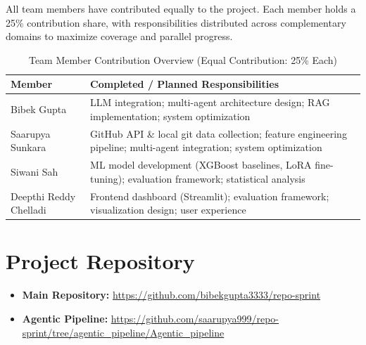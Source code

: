 \documentclass[journal]{IEEEtran}
\begin{document}
All team members have contributed equally to the project. Each member holds a 25\% contribution share, with responsibilities distributed across complementary domains to maximize coverage and parallel progress.

\begin{table}[htbp]
\centering
\caption{Team Member Contribution Overview (Equal Contribution: 25\% Each)}
\label{tab:contributions}
\begin{tabular}{l|p{5.5cm}}
\toprule
\textbf{Member} & \textbf{Completed / Planned Responsibilities} \\
\midrule
Bibek Gupta & LLM integration; multi-agent architecture design; RAG implementation; system optimization \\
\midrule
Saarupya Sunkara & GitHub API \& local git data collection; feature engineering pipeline; multi-agent integration; system optimization \\
\midrule
Siwani Sah & ML model development (XGBoost baselines, LoRA fine-tuning); evaluation framework; statistical analysis \\
\midrule
Deepthi Reddy Chelladi & Frontend dashboard (Streamlit); evaluation framework; visualization design; user experience \\
\bottomrule
\end{tabular}
\end{table}

\section{Project Repository}

\begin{itemize}
    \item \textbf{Main Repository:} \url{https://github.com/bibekgupta3333/repo-sprint}
    \item \textbf{Agentic Pipeline:} \url{https://github.com/saarupya999/repo-sprint/tree/agentic_pipeline/Agentic_pipeline}
\end{itemize}
\end{document}
